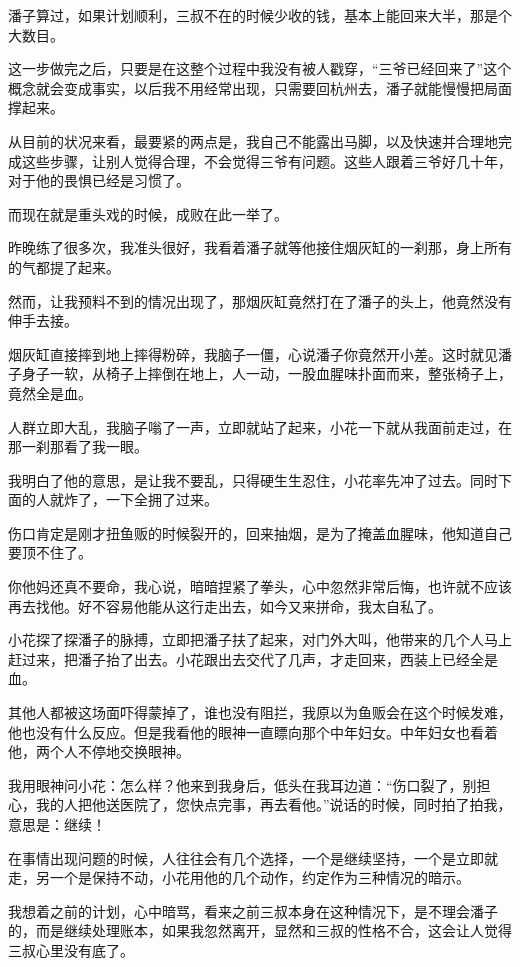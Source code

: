潘子算过，如果计划顺利，三叔不在的时候少收的钱，基本上能回来大半，那是个大数目。

这一步做完之后，只要是在这整个过程中我没有被人戳穿，“三爷已经回来了”这个概念就会变成事实，以后我不用经常出现，只需要回杭州去，潘子就能慢慢把局面撑起来。

从目前的状况来看，最要紧的两点是，我自己不能露出马脚，以及快速并合理地完成这些步骤，让别人觉得合理，不会觉得三爷有问题。这些人跟着三爷好几十年，对于他的畏惧已经是习惯了。

而现在就是重头戏的时候，成败在此一举了。

昨晚练了很多次，我准头很好，我看着潘子就等他接住烟灰缸的一刹那，身上所有的气都提了起来。

然而，让我预料不到的情况出现了，那烟灰缸竟然打在了潘子的头上，他竟然没有伸手去接。

烟灰缸直接摔到地上摔得粉碎，我脑子一僵，心说潘子你竟然开小差。这时就见潘子身子一软，从椅子上摔倒在地上，人一动，一股血腥味扑面而来，整张椅子上，竟然全是血。

人群立即大乱，我脑子嗡了一声，立即就站了起来，小花一下就从我面前走过，在那一刹那看了我一眼。

我明白了他的意思，是让我不要乱，只得硬生生忍住，小花率先冲了过去。同时下面的人就炸了，一下全拥了过来。

伤口肯定是刚才扭鱼贩的时候裂开的，回来抽烟，是为了掩盖血腥味，他知道自己要顶不住了。

你他妈还真不要命，我心说，暗暗捏紧了拳头，心中忽然非常后悔，也许就不应该再去找他。好不容易他能从这行走出去，如今又来拼命，我太自私了。

小花探了探潘子的脉搏，立即把潘子扶了起来，对门外大叫，他带来的几个人马上赶过来，把潘子抬了出去。小花跟出去交代了几声，才走回来，西装上已经全是血。

其他人都被这场面吓得蒙掉了，谁也没有阻拦，我原以为鱼贩会在这个时候发难，他也没有什么反应。但是我看他的眼神一直瞟向那个中年妇女。中年妇女也看着他，两个人不停地交换眼神。

我用眼神问小花：怎么样？他来到我身后，低头在我耳边道：“伤口裂了，别担心，我的人把他送医院了，您快点完事，再去看他。”说话的时候，同时拍了拍我，意思是：继续！

在事情出现问题的时候，人往往会有几个选择，一个是继续坚持，一个是立即就走，另一个是保持不动，小花用他的几个动作，约定作为三种情况的暗示。

我想着之前的计划，心中暗骂，看来之前三叔本身在这种情况下，是不理会潘子的，而是继续处理账本，如果我忽然离开，显然和三叔的性格不合，这会让人觉得三叔心里没有底了。

